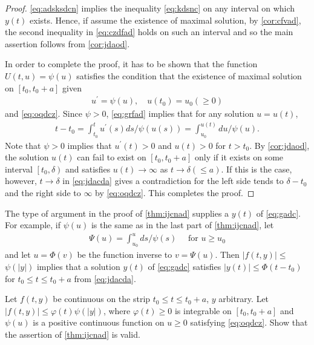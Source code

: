 \documentclass{article}
\begin{document}
\begin{proof}
\cref{eq:adsksdcn} implies the inequality \cref{eq:kdsnc} on any interval on which $y(t)$ exists. Hence, if assume the existence of maximal solution, by \cref{cor:cfvad}, the second inequality in \cref{eq:czdfad} holds on such an interval and so the main assertion follows from \cref{cor:jdaod}.

In order to complete the proof, it has to be shown that the function $U(t, u)=\psi(u)$ satisfies the condition that the existence of maximal solution  on $\left[t_{0}, t_{0}+a\right]$ given
\begin{align}
u^{\prime}=\psi(u), \quad u\left(t_{0}\right)=u_{0}(\ge 0)\label{eq:grfad}
\end{align}
and \cref{eq:oqdcz}. Since $\psi>0$, \cref{eq:grfad} implies that for any solution $u=u(t)$,
\begin{align}
t-t_{0}=\int_{t_{0}}^{t} u^{\prime}(s) d s / \psi(u(s))=\int_{u_{0}}^{u(t)} d u / \psi(u).\label{eq:jdacda}
\end{align}
Note that $\psi>0$ implies that $u^{\prime}(t)>0$ and $u(t)>0$ for $t>t_{0}$. By \cref{cor:jdaod}, the solution $u(t)$ can fail to exist on $\left[t_{0}, t_{0}+a\right]$ only if it exists on some interval $\left[t_{0}, \delta\right)$ and satisfies $u(t) \rightarrow \infty$ as $t \rightarrow \delta(\le a) .$ If this is the case, however, $t \rightarrow \delta$ in \cref{eq:jdacda} gives a contradiction for the left side tends to $\delta-t_{0}$ and the right side to $\infty$ by \cref{eq:oqdcz}. This completes the proof.
\end{proof}
\begin{rema}
The type of argument in the proof of \cref{thm:ijcnad} supplies a  $y(t)$ of \cref{eq:gadc}. For example, if $\psi(u)$ is the same as in the last part of \cref{thm:ijcnad}, let
\begin{align*}
\Psi(u)=\int_{u_{0}}^{u} d s / \psi(s) \quad \text { for } u \ge u_{0}
\end{align*}
and let $u=\Phi(v)$ be the function inverse to $v=\Psi(u)$. Then $|f(t, y)| \le$ $\psi(|y|)$ implies that a solution $y(t)$ of \cref{eq:gadc} satisfies
$|y(t)| \le \Phi\left(t-t_{0}\right)$ for $t_{0} \le t \le t_{0}+a$ from \cref{eq:jdacda}.
\end{rema}
\begin{cora}
 Let $f(t, y)$ be continuous on the strip $t_{0} \le t \le t_{0}+a$, $y$ arbitrary. Let $|f(t, y)| \le \varphi(t) \psi(|y|)$, where $\varphi(t) \ge 0$ is integrable on $\left[t_{0}, t_{0}+a\right]$ and $\psi(u)$ is a positive continuous function on $u \ge 0$ satisfying \cref{eq:oqdcz}. Show that the assertion of \cref{thm:ijcnad} is valid.
\end{cora}
\end{document}
